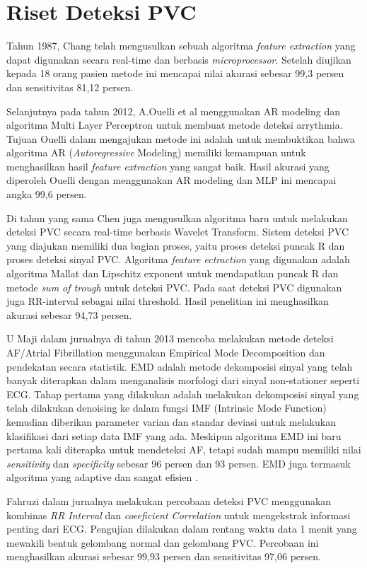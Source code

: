 \section{Riset Deteksi PVC}
Tahun 1987, Chang\cite{Chang1987} telah mengusulkan sebuah algoritma \textit{feature extraction} yang dapat digunakan secara real-time dan berbasis \textit{microprocessor}. Setelah diujikan kepada 18 orang pasien metode ini mencapai nilai akurasi sebesar 99,3 persen dan sensitivitas 81,12 persen.

Selanjutnya pada tahun 2012, A.Ouelli et al\cite{A.Ouelli2012_AR} menggunakan AR modeling dan algoritma Multi Layer Perceptron untuk membuat metode deteksi arrythmia. Tujuan Ouelli dalam mengajukan metode ini adalah untuk membuktikan bahwa algoritma AR (\textit{Autoregressive} Modeling) memiliki kemampuan untuk menghasilkan hasil \textit{feature extraction} yang sangat baik. Hasil akurasi yang diperoleh Ouelli dengan menggunakan AR modeling dan MLP ini mencapai angka 99,6 persen.

Di tahun yang sama Chen\cite{RobertChen} juga mengusulkan algoritma baru untuk melakukan deteksi PVC secara real-time berbasis Wavelet Transform. Sistem deteksi PVC yang diajukan memiliki dua bagian proses, yaitu proses deteksi puncak R dan proses deteksi sinyal PVC. Algoritma \textit{feature ectraction} yang digunakan adalah algoritma Mallat dan Lipschitz exponent untuk mendapatkan puncak R dan metode \textit{sum of trough} untuk deteksi PVC. Pada saat deteksi PVC digunakan juga RR-interval sebagai nilai threshold. Hasil penelitian ini menghasilkan akurasi sebesar 94,73 persen.

U Maji \cite{UMaji} dalam jurnalnya di tahun 2013 mencoba melakukan metode deteksi AF/Atrial Fibrillation menggunakan Empirical Mode Decomposition dan pendekatan secara statistik. EMD adalah metode dekomposisi sinyal yang telah banyak diterapkan dalam menganalisis morfologi dari sinyal non-stationer seperti ECG. Tahap pertama yang dilakukan adalah melakukan dekomposisi sinyal yang telah dilakukan denoising ke dalam fungsi IMF (Intrinsic Mode Function) kemudian diberikan parameter varian dan standar deviasi untuk melakukan klasifikasi dari setiap data IMF yang ada. Meskipun algoritma EMD ini baru pertama kali diterapka untuk mendeteksi AF, tetapi sudah mampu memiliki nilai \textit{sensitivity} dan \textit{specificity} sebesar 96 persen dan 93 persen. EMD juga termasuk algoritma yang adaptive dan sangat efisien \cite{UMaji}.

Fahruzi \cite{fahruzi} dalam jurnalnya melakukan percobaan deteksi PVC menggunakan kombinas \textit{RR Interval} dan \textit{coeeficient Correlation} untuk mengekstrak informasi penting dari ECG. Pengujian dilakukan dalam rentang waktu data 1 menit yang mewakili bentuk gelombang normal dan gelombang PVC. Percobaan ini menghasilkan akurasi sebesar 99,93 persen dan sensitivitas 97,06 persen. 

